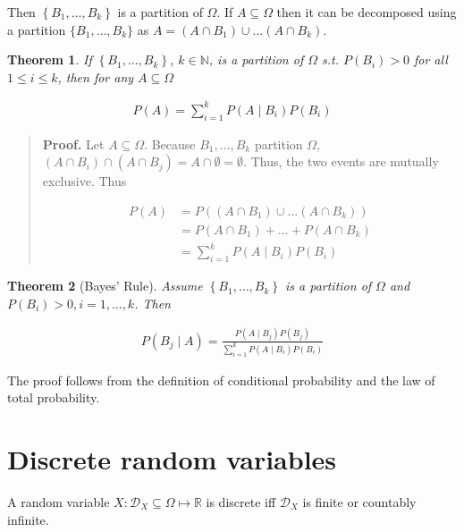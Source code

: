 \documentclass[a4paper, 12pt]{article}
\newtheorem{theorem}{Theorem}
\newtheorem{theorem}{Theorem}
\begin{document}
Then $\left\{ B_1, \ldots, B_k \right\} $ is a partition of $\Omega$. If $A
\subseteq \Omega$ then it can be decomposed using a partition $\{B_1, \ldots,
B_k\}$ as $A = (A \cap B_1) \cup \ldots (A \cap B_k)$.

\begin{theorem}
    If $\left\{ B_1, \ldots, B_k \right\} $, $k \in \mathbb{N}$, is a partition
    of $\Omega$ s.t. $P(B_i) > 0$ for all $1\leq i \leq k$, then for any $A
    \subseteq \Omega$

    \begin{align*}
        P(A) = \sum_{i=1}^{k} P(A \mid B_i) P(B_i)
    \end{align*}
\end{theorem}


\small
\begin{quote}

\textbf{Proof.} Let $A \subseteq \Omega$. Because $B_1, \ldots, B_k$ partition
$\Omega$, $(A \cap B_i) \cap  (A \cap B_j) = A \cap \emptyset = \emptyset$.
Thus, the two events are mutually exclusive. Thus

\begin{align*}
    P(A) &= P \left( \left( A \cap B_1 \right) \cup \ldots \left( A \cap B_k
    \right)   \right)  \\ 
        &= P(A \cap B_1) + \ldots + P(A \cap B_k) \\ 
        &= \sum_{i=1}^{k} P(A \mid B_i)P(B_i)
\end{align*}

\end{quote}
\normalsize

\begin{theorem}[Bayes' Rule]
    Assume $\left\{ B_1, \ldots, B_k \right\} $ is a partition of $\Omega$ and
    $P(B_i) > 0, i = 1, \ldots, k$. Then 

    \begin{align*}
        P(B_j \mid A) = \frac{P(A \mid B_j) P(B_j)}{\sum_{i=1}^{k}P(A \mid
        B_i)P(B_i)}
    \end{align*}
\end{theorem}

The proof follows from the definition of conditional probability and the law of
total probability.


\section{Discrete random variables}

A random variable $X : \mathcal{D}_X \subseteq  \Omega \mapsto \mathbb{R}$ is
discrete iff $\mathcal{D}_X$ is finite or countably infinite. 
\end{document}
